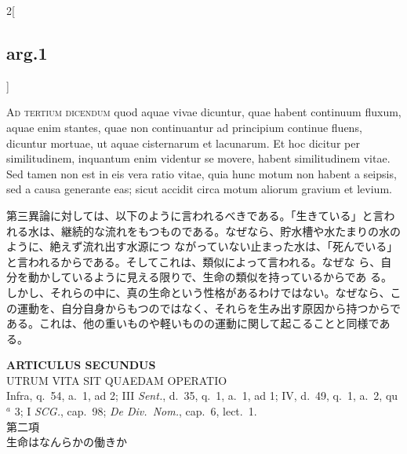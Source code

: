 \documentclass[paper=a4paper,fontsize=10pt,jafontsize=9pt,titlepage]{jlreq}
\begin{document}
\begin{paracol}{2}[\subsection{arg.1}]
\switchcolumn*[\subsection{ad.3}]


{\scshape Ad tertium dicendum} quod aquae vivae dicuntur, quae habent
 continuum fluxum, aquae enim stantes, quae non continuantur ad
 principium continue fluens, dicuntur mortuae, ut aquae cisternarum et
 lacunarum. Et hoc dicitur per similitudinem, inquantum enim videntur se
 movere, habent similitudinem vitae. Sed tamen non est in eis vera ratio
 vitae, quia hunc motum non habent a seipsis, sed a causa generante eas;
 sicut accidit circa motum aliorum gravium et levium.

\switchcolumn

第三異論に対しては、以下のように言われるべきである。「生きている」と言わ
れる水は、継続的な流れをもつものである。なぜなら、貯水槽や水たまりの水のように、絶えず流れ出す水源につ
ながっていない止まった水は、「死んでいる」と言われるからである。そしてこれは、類似によって言われる。なぜな
ら、自分を動かしているように見える限りで、生命の類似を持っているからであ
る。しかし、それらの中に、真の生命という性格があるわけではない。なぜなら、こ
の運動を、自分自身からもつのではなく、それらを生み出す原因から持つからで
ある。これは、他の重いものや軽いものの運動に関して起こることと同様である。

\end{paracol}
\newpage


{}
\setcounter{section}{2}
\setcounter{subsection}{0}
\begin{center}
 {\Large {\bfseries ARTICULUS SECUNDUS}}\\
 {\large UTRUM VITA SIT QUAEDAM OPERATIO}\\
 {\footnotesize Infra, q.~54, a.~1, ad 2; III {\itshape Sent.}, d.~35,
 q.~1, a.~1, ad 1; IV, d.~49, q.~1, a.~2, qu$^a$ 3; I {\itshape SCG.},
 cap.~98; {\itshape De Div.~Nom.}, cap.~6, lect.~1.}\\
 {\Large 第二項\\生命はなんらかの働きか}
\end{center}
\end{document}
